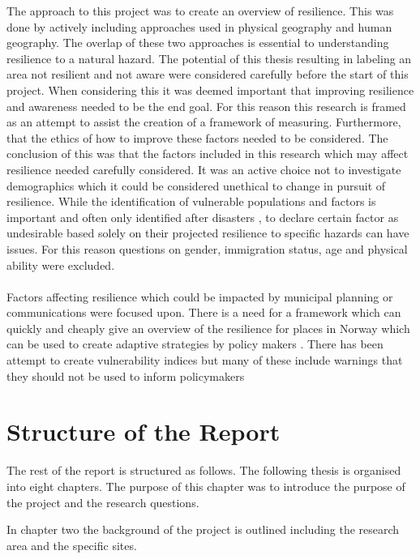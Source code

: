 The approach to this project was to create an overview of resilience. This was done by actively including approaches used in physical geography and human geography. The overlap of these two approaches is essential to understanding resilience to a natural hazard. The potential of this thesis resulting in labeling an area not resilient and not aware were considered carefully before the start of this project. When considering this it was deemed important that improving resilience and awareness needed to be the end goal. For this reason this research is framed as an attempt to assist the creation of a framework of measuring. Furthermore, that the ethics of how to improve these factors needed to be considered.  The conclusion of this was that the factors included in this research which may affect resilience needed carefully considered. It was an active choice not to investigate demographics which it could be considered unethical to change in pursuit of resilience. While  the identification of vulnerable populations and factors is important and often only identified after disasters \cite{cutter_community_2020}, to declare certain factor as undesirable based solely on their projected resilience to specific hazards can have issues. For this reason questions on gender, immigration status, age and physical ability were excluded. 

\paragraph{}
Factors affecting resilience which could be impacted by municipal planning or communications were focused upon. There is a need for a framework which can quickly and cheaply give an overview of the resilience for places in Norway which can be used to create adaptive strategies by policy makers \cite{opach_seeking_2020}. There has been attempt to create vulnerability indices but many of these include warnings that they should not be used to inform policymakers \cite{opach_seeking_2020}


\section{Structure of the Report}
The rest of the report is structured as follows. 
The following thesis is organised into eight chapters. The purpose of this chapter was to introduce the purpose of the project and the research questions.

In chapter two the background of the project is outlined including the research area and the specific sites. 

